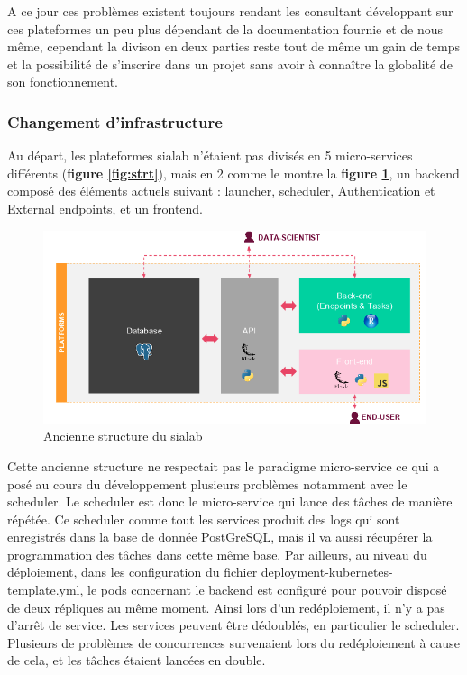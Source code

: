 \documentclass{article} %
\begin{document}
A ce jour ces problèmes existent toujours rendant les consultant développant sur ces plateformes un peu plus dépendant de la documentation fournie et de nous même, cependant la divison en deux parties reste tout de même un gain de temps et la possibilité de s'inscrire dans un projet sans avoir à connaître la globalité de son fonctionnement.
 
\subsubsection{Changement d'infrastructure}
Au départ, les plateformes sialab n'étaient pas divisés en 5 micro-services différents (\textbf{figure \ref{fig:strt}}), mais en 2 comme le montre la \textbf{figure \ref{fig:strtold}}, un backend composé des éléments actuels suivant : launcher, scheduler, Authentication et External endpoints, et un frontend. 

\begin{figure}[!h]
	\centering
	\includegraphics[keepaspectratio = true,scale=0.6]{structancienne.png}
	\caption{Ancienne structure du sialab}
	\label{fig:strtold}
\end{figure}

Cette ancienne structure ne respectait pas le paradigme micro-service ce qui a posé au cours du développement plusieurs problèmes notamment avec le scheduler. Le scheduler est donc le micro-service qui lance des tâches de manière répétée. Ce scheduler comme tout les services produit des logs qui sont enregistrés dans la base de donnée PostGreSQL, mais il va aussi récupérer la programmation des tâches dans cette même base. Par ailleurs, au niveau du déploiement, dans les configuration du fichier deployment-kubernetes-template.yml, le pods concernant le backend est configuré pour pouvoir disposé de deux répliques au même moment. Ainsi lors d'un redéploiement, il n'y a pas d'arrêt de service. Les services peuvent être dédoublés, en particulier le scheduler. Plusieurs de problèmes de concurrences survenaient lors du redéploiement à cause de cela, et les tâches étaient lancées en double.\\
\end{document}
